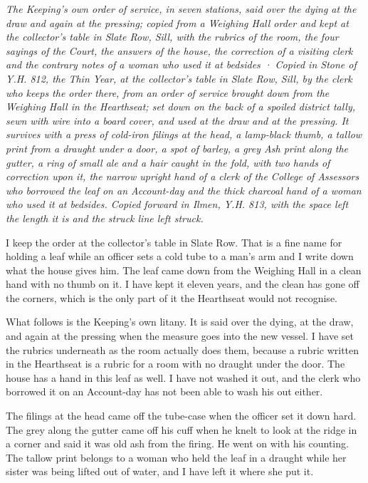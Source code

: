 \documentclass{design/chronicle}
\begin{document}
\clearpage{}
{\centering\FellFont\itshape\footnotesize\color{faded} The Keeping’s own order of service, in seven stations, said over the dying at the draw and again at the pressing; copied from a Weighing Hall order and kept at the collector’s table in Slate Row, Sill, with the rubrics of the room, the four sayings of the Court, the answers of the house, the correction of a visiting clerk and the contrary notes of a woman who used it at bedsides · Copied in Stone of Y.H. 812, the Thin Year, at the collector’s table in Slate Row, Sill, by the clerk who keeps the order there, from an order of service brought down from the Weighing Hall in the Hearthseat; set down on the back of a spoiled district tally, sewn with wire into a board cover, and used at the draw and at the pressing. It survives with a press of cold-iron filings at the head, a lamp-black thumb, a tallow print from a draught under a door, a spot of barley, a grey Ash print along the gutter, a ring of small ale and a hair caught in the fold, with two hands of correction upon it, the narrow upright hand of a clerk of the College of Assessors who borrowed the leaf on an Account-day and the thick charcoal hand of a woman who used it at bedsides. Copied forward in Ilmen, Y.H. 813, with the space left the length it is and the struck line left struck.\par}\medskip
I keep the order at the collector’s table in Slate Row. That is a fine name for holding a leaf while an officer sets a cold tube to a man’s arm and I write down what the house gives him. The leaf came down from the Weighing Hall in a clean hand with no thumb on it. I have kept it eleven years, and the clean has gone off the corners, which is the only part of it the Hearthseat would not recognise.

What follows is the Keeping’s own litany. It is said over the dying, at the draw, and again at the pressing when the measure goes into the new vessel. I have set the rubrics underneath as the room actually does them, because a rubric written in the Hearthseat is a rubric for a room with no draught under the door. The house has a hand in this leaf as well. I have not washed it out, and the clerk who borrowed it on an Account-day has not been able to wash his out either.

The filings at the head came off the tube-case when the officer set it down hard. The grey along the gutter came off his cuff when he knelt to look at the ridge in a corner and said it was old ash from the firing. He went on with his counting. The tallow print belongs to a woman who held the leaf in a draught while her sister was being lifted out of water, and I have left it where she put it.
\end{document}
